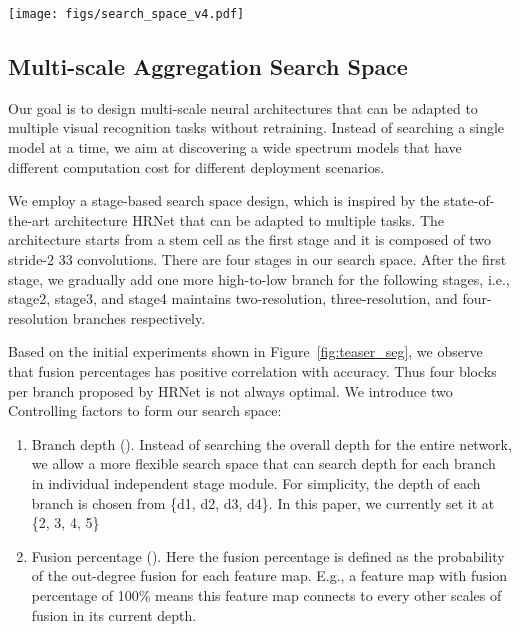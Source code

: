 \documentclass[final]{cvpr}
\newcommand{\workname}{ScaleNAS\xspace}
\begin{document}
\begin{figure*}[ht]
    \centering
    \texttt{[image: figs/search\_space\_v4.pdf]}
\caption{Search space overview of \workname. Our search space inherit the spirit of HRNet that has few stages. \workname adopts a flexible search space with arbitrary number of blocks and cross-scale feature fusions.
  }
    \label{fig:search_space}
\end{figure*}



\subsection{Multi-scale Aggregation Search Space}
\label{sec:search_space_design}

Our goal is to design multi-scale neural architectures that can be adapted to multiple visual recognition tasks without retraining. Instead of searching a single model at a time, we aim at discovering a wide spectrum models that have different computation cost for different deployment scenarios. 

We employ a stage-based search space design, which is inspired by the state-of-the-art architecture HRNet that can be adapted to multiple tasks.
The architecture starts from a stem cell as the first stage and it is composed of two stride-2 33 convolutions. There are four stages in our search space. After the first stage, we gradually add one more high-to-low branch for the following stages, i.e., stage2, stage3, and stage4 maintains two-resolution, three-resolution, and four-resolution branches respectively.

Based on the initial experiments shown in Figure~\ref{fig:teaser_seg}, we observe that fusion percentages has positive correlation with accuracy. 
Thus four blocks per branch proposed by HRNet is not always optimal. 
We introduce two Controlling factors to form our search space: \
\begin{enumerate}
    \item Branch depth (). Instead of searching the overall depth for the entire network, we allow a more flexible search space that can search depth for each branch in individual independent stage module. For simplicity, the depth of each branch is chosen from \{d1, d2, d3, d4\}. In this paper, we currently set it at \{2, 3, 4, 5\}
    \item Fusion percentage (). Here the fusion percentage is defined as the probability of the out-degree fusion for each feature map. E.g., a feature map with fusion percentage of 100\% means this feature map connects to every other scales of fusion in its current depth.

\end{enumerate}
\end{document}
